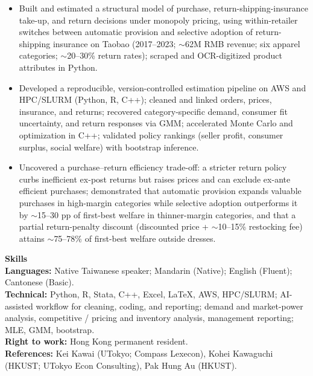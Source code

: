 \documentclass[11pt,letterpaper]{article}
\begin{document}
\begin{itemize}
  \item Built and estimated a structural model of purchase, return-shipping-insurance take-up, and return decisions under monopoly pricing, using within-retailer switches between automatic provision and selective adoption of return-shipping insurance on Taobao (2017--2023; \(\sim\)62M RMB revenue; six apparel categories; \(\sim\)20--30\% return rates); scraped and OCR-digitized product attributes in Python.
  \item Developed a reproducible, version-controlled estimation pipeline on AWS and HPC/SLURM (Python, R, C++); cleaned and linked orders, prices, insurance, and returns; recovered category-specific demand, consumer fit uncertainty, and return responses via GMM; accelerated Monte Carlo and optimization in C++; validated policy rankings (seller profit, consumer surplus, social welfare) with bootstrap inference.
  \item Uncovered a purchase--return efficiency trade-off: a stricter return policy curbs inefficient ex-post returns but raises prices and can exclude ex-ante efficient purchases; demonstrated that automatic provision expands valuable purchases in high-margin categories while selective adoption outperforms it by \(\sim\)15--30 pp of first-best welfare in thinner-margin categories, and that a partial return-penalty discount (discounted price + \(\sim\)10--15\% restocking fee) attains \(\sim\)75--78\% of first-best welfare outside dresses.
\end{itemize}

\vspace{0.15pt}

{\large \textbf{Skills}}\\[-0.5pt]
\textbf{Languages:} Native Taiwanese speaker; Mandarin (Native); English (Fluent); Cantonese (Basic).\\
\textbf{Technical:} Python, R, Stata, C++, Excel, \LaTeX, AWS, HPC/SLURM; AI-assisted workflow for cleaning, coding, and reporting; demand and market-power analysis, competitive / pricing and inventory analysis, management reporting; MLE, GMM, bootstrap.\\
\textbf{Right to work:} Hong Kong permanent resident.\\
\textbf{References:} Kei Kawai (UTokyo; Compass Lexecon), Kohei Kawaguchi (HKUST; UTokyo Econ Consulting), Pak Hung Au (HKUST).
\end{document}
